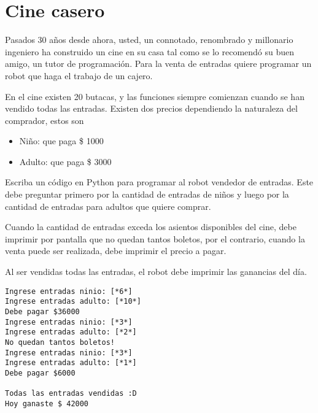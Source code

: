 \section*{Cine casero}

Pasados 30 años desde ahora, usted, un connotado, renombrado y millonario ingeniero ha construido un cine en su casa tal como se lo recomendó su buen amigo, un tutor de programación. Para la venta de entradas quiere programar un robot que haga el trabajo de un cajero.


En el cine existen 20 butacas, y las funciones siempre comienzan cuando se han vendido todas las entradas. Existen dos precios dependiendo la naturaleza del comprador, estos son 

\begin{itemize}
    \item Niño: que paga \$ 1000
    \item Adulto: que paga \$ 3000
\end{itemize}

Escriba un código en Python para programar al robot vendedor de entradas. Este debe preguntar primero por la cantidad de entradas de niños y luego por la cantidad de entradas para adultos que quiere comprar. 

Cuando la cantidad de entradas exceda los asientos disponibles del cine, debe imprimir por pantalla que no quedan tantos boletos, por el contrario, cuando la venta puede ser realizada, debe imprimir el precio a pagar. 

Al ser vendidas todas las entradas, el robot debe imprimir las ganancias del día.

\begin{lstlisting}[style=consola]
Ingrese entradas ninio: [*6*]
Ingrese entradas adulto: [*10*]
Debe pagar $36000
Ingrese entradas ninio: [*3*]
Ingrese entradas adulto: [*2*]
No quedan tantos boletos!
Ingrese entradas ninio: [*3*]
Ingrese entradas adulto: [*1*]
Debe pagar $6000

Todas las entradas vendidas :D
Hoy ganaste $ 42000
\end{lstlisting}